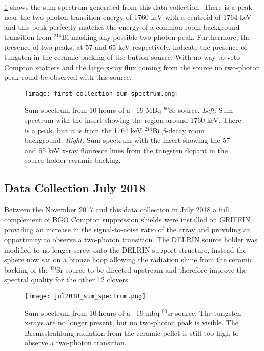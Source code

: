 \documentclass[cnatzke_thesis_proposal.tex]{subfiles}
\begin{document}
\ref{fig:sum_spectrum_jul2017} shows the sum spectrum generated from this data collection. 
There is a peak near the two-photon transition energy of 1760 keV with a centroid of 1764 keV and this peak perfectly matches the energy of a common room background transition from $^{214}$Bi masking any possible two-photon peak. 
Furthermore, the presence of two peaks, at 57 and 65 keV respectively, indicate the presence of tungsten in the ceramic backing of the button source. 
With no way to veto Compton scatters and the large x-ray flux coming from the source no two-photon peak could be observed with this source. 

\begin{figure}[htbp]
  \centering
  \texttt{[image: first\_collection\_sum\_spectrum.png]}
  \caption{Sum spectrum from 10 hours of a ~19 MBq $^{90}$Sr source.
    \textit{Left:} Sum spectrum with the insert showing the region around 1760 keV. There is a peak, but it is from the 1764 keV $^{214}$Bi $\beta$-decay room background. 
    \textit{Right:} Sum spectrum with the insert showing the 57 and 65 keV x-ray flouresce lines from the tungsten dopant in the source holder ceramic backing.
  }
  \label{fig:sum_spectrum_jul2017}
\end{figure}

\subsection{Data Collection July 2018}
Between the November 2017 and this data collection in July 2018 a full complement of BGO Compton suppression shields were installed on GRIFFIN providing an increase in the signal-to-noise ratio of the array and providing an opportunity to observe a two-photon transition. 
The DELRIN source holder was modified to no longer screw onto the DELRIN support structure, instead the sphere now sat on a bronze hoop allowing the radiation shine from the ceramic backing of the $^{90}$Sr source to be directed upstream and therefore improve the spectral quality for the other 12 clovers


\begin{figure}[htbp]
  \centering
  \texttt{[image: jul2018\_sum\_spectrum.png]}
  \caption{Sum spectrum from 10 hours of a ~19 mbq $^{90}$sr source. The tungsten x-rays are no longer present, but no two-photon peak is visible. The Bremsstrahlung radiation from the ceramic pellet is still too high to observe a two-photon transition.
  }
  \label{fig:sum_spectrum_oct2018}
\end{figure}
\end{document}
